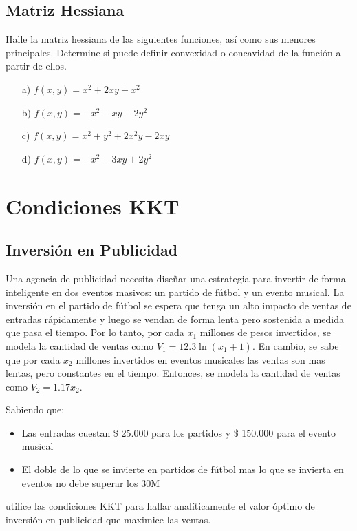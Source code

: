 \documentclass[12pt]{article}
\begin{document}
\subsection{Matriz Hessiana}

Halle la matriz hessiana de las siguientes funciones, así como sus menores principales. Determine si puede definir convexidad o concavidad de la función a partir de ellos. 

\begin{itemize}
    \item[a)] $f(x,y) = x^2 + 2xy + x^2$
    \item[b)] $f(x,y) = -x^2 -xy -2y^2$
    \item[c)] $f(x,y) = x^2 + y^2 +2x^2y - 2xy $
    \item[d)] $f(x,y) = -x^2 -3xy+2y^2$
\end{itemize}

\section{Condiciones KKT}

\subsection{Inversión en Publicidad}

Una agencia de publicidad necesita diseñar una estrategia para invertir de forma inteligente en dos eventos masivos: un partido de fútbol y un evento musical. La inversión en el partido de fútbol se espera que tenga un alto impacto de ventas de entradas rápidamente y luego se vendan de forma lenta pero sostenida a medida que pasa el tiempo. Por lo tanto, por cada $x_1$ millones de pesos invertidos, se modela la cantidad de ventas como $V_1 = 12.3 \ln (x_1+1)$. En cambio, se sabe que por cada $x_2$ millones invertidos en eventos musicales las ventas son mas lentas, pero constantes en el tiempo. Entonces, se modela la cantidad de ventas como $V_2 = 1.17 x_2$.
 
Sabiendo que:
\begin{itemize}
    \item Las entradas cuestan \$ 25.000 para los partidos y \$ 150.000 para el evento musical
    \item El doble de lo que se invierte en partidos de fútbol mas lo que se invierta en eventos no debe superar los 30M
\end{itemize}
utilice las condiciones KKT para hallar analíticamente el valor óptimo de inversión en publicidad que maximice las ventas.
\end{document}
